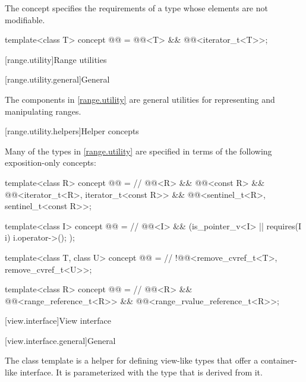 \pnum
The  concept specifies the requirements of a
 type whose elements are not modifiable.

\begin{itemdecl}
template<class T>
  concept @@ =
    @@<T> && @@<iterator_t<T>>;
\end{itemdecl}

[range.utility]{Range utilities}

[range.utility.general]{General}

\pnum
The components in \ref{range.utility} are general utilities for representing and
manipulating ranges.

[range.utility.helpers]{Helper concepts}

\pnum
Many of the types in \ref{range.utility} are specified in terms of
the following exposition-only concepts:

\begin{codeblock}
template<class R>
  concept @@ =                                     // \expos
    @@<R> && @@<const R> &&
    @@<iterator_t<R>, iterator_t<const R>> &&
    @@<sentinel_t<R>, sentinel_t<const R>>;

template<class I>
  concept @@ =                                       // \expos
    @@<I> && (is_pointer_v<I> || requires(I i) { i.operator->(); });

template<class T, class U>
  concept @@ =                                  // \expos
    !@@<remove_cvref_t<T>, remove_cvref_t<U>>;

template<class R>
  concept @@ =                   // \expos
    @@<R> && @@<range_reference_t<R>> &&
    @@<range_rvalue_reference_t<R>>;
\end{codeblock}

[view.interface]{View interface}

[view.interface.general]{General}

\pnum
The class template  is a helper for defining
view-like types that offer a container-like interface. It is
parameterized with the type that is derived from it.

